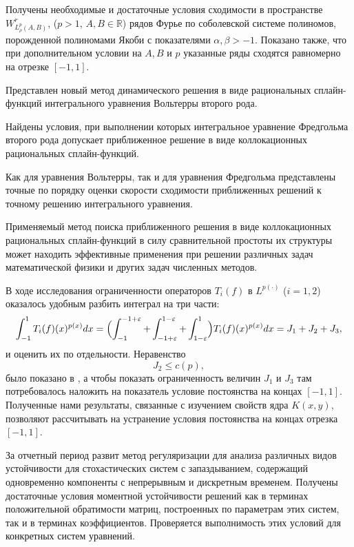 Получены необходимые и достаточные условия сходимости в пространстве $W^r_{L^p_\rho(A,B)}$, ($p > 1$, $A, B \in \mathbb{R}$) рядов Фурье по соболевской системе полиномов, порожденной полиномами Якоби с показателями $\alpha, \beta  > -1$. Показано также, что при дополнительном условии на $A, B$ и $p$ указанные ряды сходятся равномерно на отрезке $[-1,1]$.


Представлен новый метод динамического решения в виде рациональных
сплайн-функций интегрального уравнения Вольтерры второго рода.

Найдены условия, при выполнении которых интегральное уравнение
Фредгольма второго рода допускает приближенное решение в виде
коллокационных рациональных сплайн-функций.

Как для уравнения Вольтерры, так и для уравнения Фредгольма
представлены точные по порядку оценки скорости сходимости
приближенных решений к точному решению интегрального уравнения.

Применяемый метод поиска приближенного решения в виде
коллокационных рациональных сплайн-функций в силу
сравнительной простоты их структуры
может находить эффективные применения
при решении различных задач математической
физики и других задач численных методов.


В ходе исследования ограниченности операторов $T_i(f)$ в $L^{p(\cdot)}$ ($i=1,2$) оказалось удобным разбить интеграл на три части:
\begin{equation*}
\int_{-1}^1 T_i(f)(x)^{p(x)}dx=\Bigl(\int_{-1}^{-1+\varepsilon} + \int_{-1+\varepsilon}^{1-\varepsilon} + \int_{1-\varepsilon}^{1}\Bigr)T_i(f)(x)^{p(x)}dx=J_1+J_2+J_3,
\end{equation*}
и оценить их по отдельности. Неравенство
$$
J_2\le c(p),
$$
было показано в \cite{tad-SHII-Leg}, а чтобы показать ограниченность величин $J_1$ и $J_3$ там потребовалось наложить на показатель условие постоянства на концах $[-1,1]$. Полученные нами результаты, связанные с изучением свойств ядра $K(x,y)$, позволяют рассчитывать на устранение условия постоянства на концах отрезка $[-1,1]$.

За отчетный период развит метод регуляризации для анализа различных видов устойчивости  для  стохастических систем с запаздыванием, содержащий одновременно компоненты с непрерывным и дискретным временем. Получены  достаточные условия моментной устойчивости решений как в терминах положительной обратимости матриц, построенных по параметрам этих систем, так и в терминах коэффициентов. Проверяется выполнимость этих условий для конкретных систем уравнений.

